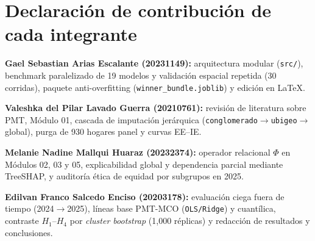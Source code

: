 \section{Declaración de contribución de cada integrante}
\textbf{Gael Sebastian Arias Escalante (20231149):} arquitectura modular (\texttt{src/}), benchmark paralelizado de 19 modelos y validación espacial repetida (30 corridas), paquete anti-overfitting (\texttt{winner\_bundle.joblib}) y edición en \LaTeX.\par
\textbf{Valeshka del Pilar Lavado Guerra (20210761):} revisión de literatura sobre PMT, Módulo 01, cascada de imputación jerárquica (\texttt{conglomerado}$\rightarrow$\texttt{ubigeo}$\rightarrow$global), purga de 930 hogares panel y curvas EE--IE.\par
\textbf{Melanie Nadine Mallqui Huaraz (20232374):} operador relacional $\Phi$ en Módulos 02, 03 y 05, explicabilidad global y dependencia parcial mediante TreeSHAP, y auditoría ética de equidad por subgrupos en 2025.\par
\textbf{Edilvan Franco Salcedo Enciso (20203178):} evaluación ciega fuera de tiempo (2024$\rightarrow$2025), líneas base PMT-MCO (\texttt{OLS/Ridge}) y cuantílica, contraste $H_1$--$H_4$ por \textit{cluster bootstrap} (1,000 réplicas) y redacción de resultados y conclusiones.
